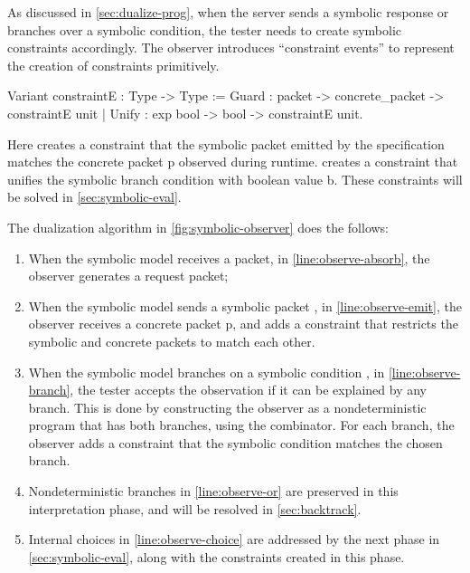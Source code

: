 As discussed in \autoref{sec:dualize-prog}, when the server sends a symbolic
response or branches over a symbolic condition, the tester needs to create
symbolic constraints accordingly.  The observer introduces ``constraint events''
to represent the creation of constraints primitively.
\begin{coq}
  Variant constraintE : Type -> Type :=
    Guard : packet -> concrete_packet -> constraintE unit
  | Unify : exp bool -> bool -> constraintE unit.
\end{coq}

Here  creates a constraint that the symbolic packet 
emitted by the specification matches the concrete packet \ilc p observed during
runtime.   creates a constraint that unifies the symbolic
branch condition  with boolean value \ilc b.  These constraints will be
solved in \autoref{sec:symbolic-eval}.

The dualization algorithm in \autoref{fig:symbolic-observer} does the follows:
\begin{enumerate}
\item When the symbolic model receives a packet, in
\autoref{line:observe-absorb}, the observer generates a request packet;

\item When the symbolic model sends a symbolic packet , in
\autoref{line:observe-emit}, the observer receives a concrete packet \ilc p, and
adds a  constraint that restricts the symbolic and concrete packets
to match each other.

\item When the symbolic model branches on a symbolic condition ,
in \autoref{line:observe-branch}, the tester accepts the observation if it can
be explained by any branch.  This is done by constructing the observer as a
nondeterministic program that has both branches, using the  combinator.
For each branch, the observer adds a  constraint that the symbolic
condition matches the chosen branch.

\item Nondeterministic branches in \autoref{line:observe-or} are preserved in
this interpretation phase, and will be resolved in \autoref{sec:backtrack}.

\item Internal choices in \autoref{line:observe-choice} are addressed by the
next phase in \autoref{sec:symbolic-eval}, along with the constraints created in
this phase.
\end{enumerate}

